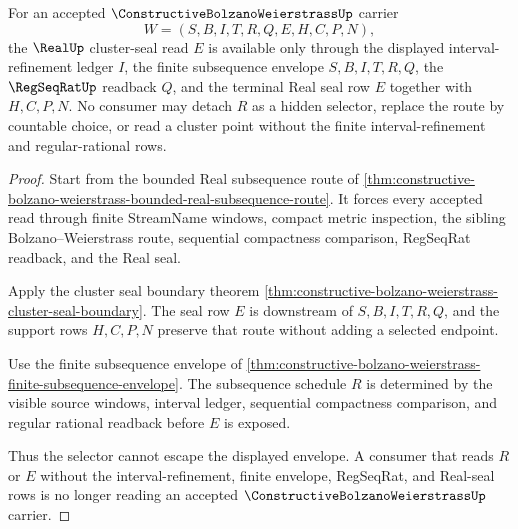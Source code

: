 \begin{theorem}
\label{thm:constructive-bolzano-weierstrass-selector-nonescape}
For an accepted $\ConstructiveBolzanoWeierstrassUp$ carrier
$$
W=(S,B,I,T,R,Q,E,H,C,P,N),
$$
the $\RealUp$ cluster-seal read $E$ is available only through the displayed interval-refinement ledger $I$, the finite subsequence envelope $S,B,I,T,R,Q$, the $\RegSeqRatUp$ readback $Q$, and the terminal Real seal row $E$ together with $H,C,P,N$. No consumer may detach $R$ as a hidden selector, replace the route by countable choice, or read a cluster point without the finite interval-refinement and regular-rational rows.
\end{theorem}
\begin{proof}
Start from the bounded Real subsequence route of \autoref{thm:constructive-bolzano-weierstrass-bounded-real-subsequence-route}. It forces every accepted read through finite StreamName windows, compact metric inspection, the sibling Bolzano--Weierstrass route, sequential compactness comparison, RegSeqRat readback, and the Real seal.

Apply the cluster seal boundary theorem \autoref{thm:constructive-bolzano-weierstrass-cluster-seal-boundary}. The seal row $E$ is downstream of $S,B,I,T,R,Q$, and the support rows $H,C,P,N$ preserve that route without adding a selected endpoint.

Use the finite subsequence envelope of \autoref{thm:constructive-bolzano-weierstrass-finite-subsequence-envelope}. The subsequence schedule $R$ is determined by the visible source windows, interval ledger, sequential compactness comparison, and regular rational readback before $E$ is exposed.

Thus the selector cannot escape the displayed envelope. A consumer that reads $R$ or $E$ without the interval-refinement, finite envelope, RegSeqRat, and Real-seal rows is no longer reading an accepted $\ConstructiveBolzanoWeierstrassUp$ carrier.
\end{proof}


